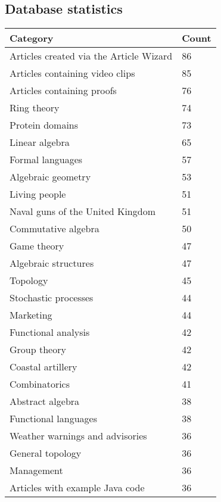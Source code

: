 \begin{appendices}
\chapter{Database statistics}

\begin{table}[h!]
\centering
\begin{tabular} {|| p{20em} | p{5em} ||} 
 \hline
 Category & Count \\ [0.5ex] 
 \hline
 Articles created via the Article Wizard & 86 \\
Articles containing video clips & 85 \\
Articles containing proofs & 76 \\
Ring theory & 74 \\
Protein domains & 73 \\
Linear algebra & 65 \\
Formal languages & 57 \\
Algebraic geometry & 53 \\
Living people & 51 \\
Naval guns of the United Kingdom & 51 \\
Commutative algebra & 50 \\
Game theory & 47 \\
Algebraic structures & 47 \\
Topology & 45 \\
Stochastic processes & 44 \\
Marketing & 44 \\
Functional analysis & 42 \\
Group theory & 42 \\
Coastal artillery & 42 \\
Combinatorics & 41 \\
Abstract algebra & 38 \\
Functional languages & 38 \\
Weather warnings and advisories & 36 \\
General topology & 36 \\
Management & 36 \\
Articles with example Java code & 36 \\

\end{tabular}
\end{table}
\end{appendices}

